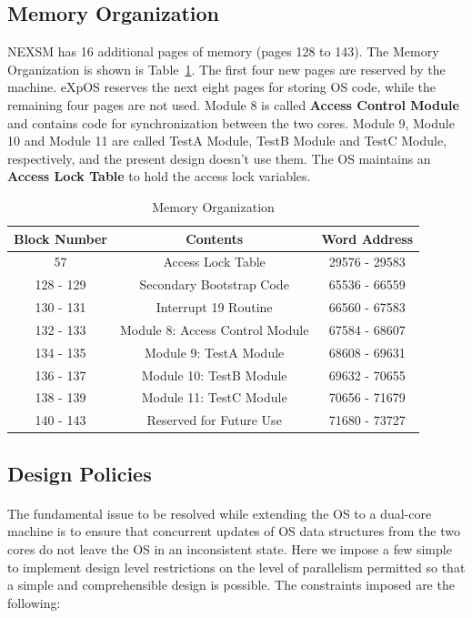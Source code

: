 \documentclass[12pt]{report}
\begin{document}
\subsection{Memory Organization}
NEXSM has 16 additional pages of memory (pages 128 to 143). The Memory Organization is shown is Table~\ref{memorg}. The first four new pages are reserved by the machine. eXpOS reserves the next eight pages for storing OS code, while the remaining four pages are not used. Module 8 is called \textbf{Access Control Module} and contains code for synchronization between the two cores. Module 9, Module 10 and Module 11 are called TestA Module, TestB Module and TestC Module, respectively, and the present design doesn't use them.
The OS maintains an \textbf{Access Lock Table} to hold the access lock variables.

\begin{table}[h!]
    \centering
    \begin{tabular}{|c|c|c|}
        \hline
        \textbf{Block Number} & \textbf{Contents} & \textbf{Word Address} \\ [0.5ex]
        \hline
        57 & Access Lock Table & 29576 - 29583 \\
        \hline
        128 - 129 & Secondary Bootstrap Code & 65536 - 66559 \\
        \hline
        130 - 131 & Interrupt 19 Routine & 66560 - 67583 \\
        \hline
        132 - 133 & Module 8: Access Control Module & 67584 - 68607 \\
        \hline
        134 - 135 & Module 9: TestA Module & 68608 - 69631 \\
        \hline
        136 - 137 & Module 10: TestB Module & 69632 - 70655 \\
        \hline
        138 - 139 & Module 11: TestC Module & 70656 - 71679 \\
        \hline
        140 - 143 & Reserved for Future Use & 71680 - 73727 \\
        \hline
    \end{tabular}
    \caption{Memory Organization}
    \label{memorg}
\end{table}

\subsection{Design Policies}
\paragraph{}
The fundamental issue to be resolved while extending the OS to a dual-core machine is to ensure that concurrent updates of OS data structures from the two cores do not leave the OS in an inconsistent state. Here we impose a few simple to implement design level restrictions on the level of parallelism permitted so that a simple and comprehensible design is possible. The constraints imposed are the following:
\end{document}
